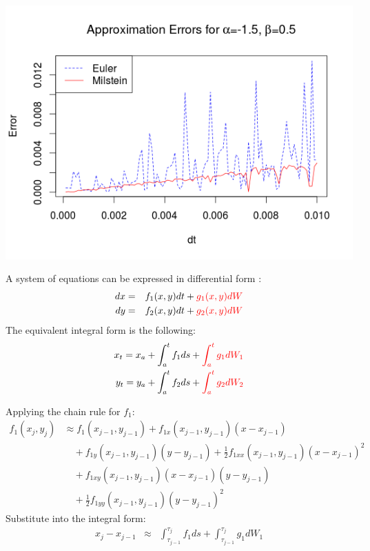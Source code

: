 \begin{frame}
	\begin{center}
	\includegraphics[scale=0.55]{alpham15_beta05.png} 
	\end{center}
\end{frame}

\begin{frame}
A system of equations can be expressed in differential form \cite{klodenNumerics}:
	\begin{eqnarray*}
		dx&=&f_1(x,y)dt+{\color{red}g_1(x,y)dW}\\
		dy&=&f_2(x,y)dt+{\color{red}g_2(x,y)dW}\\
	\end{eqnarray*}
The equivalent integral form is the following:
	\begin{eqnarray*}
		x_t=x_a+\int_{a}^{t}f_1 ds+{\color{red}\int_{a}^{t}g_1dW_1}\\
		y_t=y_a+\int_{a}^{t}f_2 ds+{\color{red}\int_{a}^{t}g_2dW_2}\\
	\end{eqnarray*}	
\end{frame}


\begin{frame}
Applying the chain rule for $f_1$:
	\begin{equation*}
	\begin{split}
	f_1(x_j,y_j) & \approx f_1(x_{j-1},y_{j-1})+f_{1x}(x_{j-1},y_{j-1})(x-x_{j-1})\\
	& \quad +f_{1y}(x_{j-1},y_{j-1})(y-y_{j-1})+\frac{1}{2} f_{1xx}(x_{j-1},y_{j-1})(x-
	x_{j-1})^2\\
	& \quad +f_{1xy}(x_{j-1},y_{j-1})(x-x_{j-1})(y-y_{j-1})\\
	& \quad +\frac{1}{2}f_{1yy}(x_{j-1},y_{j-1})(y-y_{j-1})^2
	\end{split}
	\end{equation*}
Substitute into the integral form:
	\begin{eqnarray*}
	x_j-x_{j-1} & \approx & \int_{\tau_{j-1}}^{\tau_{j}}f_1 ds+\int_{\tau_{j-1}}^{\tau_{j}}g_1dW_1
	\end{eqnarray*}
\end{frame}


